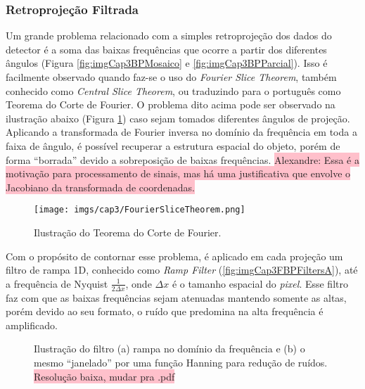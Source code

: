 \subsubsection{Retroprojeção Filtrada}\label{RetroprojeçãoFiltrada}

Um grande problema relacionado com a simples retroprojeção dos dados do detector é a soma das baixas frequências que ocorre a partir dos diferentes ângulos (Figura \ref{fig:imgCap3BPMosaico} e \ref{fig:imgCap3BPParcial}). Isso é facilmente observado quando faz-se o uso do \textit{Fourier Slice Theorem}, também conhecido como \textit{Central Slice Theorem}, ou traduzindo para o português como Teorema do Corte de Fourier. O problema dito acima pode ser observado na ilustração abaixo (Figura \ref{fig:imgCap3FourierSliceTheorem}) caso sejam tomados diferentes ângulos de projeção. Aplicando a transformada de Fourier inversa no domínio da frequência em toda a faixa de ângulo, é possível recuperar a estrutura espacial do objeto, porém de forma ``borrada'' devido a sobreposição de baixas frequências. \colorbox{pink}{Alexandre: Essa é a motivação para processamento de sinais, mas há uma justificativa que envolve o Jacobiano da transformada de coordenadas.}    

\begin{figure}[H]
	\caption{Ilustração do Teorema do Corte de Fourier.}
	\begin{center}
		\texttt{[image: imgs/cap3/FourierSliceTheorem.png]}
	\end{center}
	\label{fig:imgCap3FourierSliceTheorem}
\end{figure}

Com o propósito de contornar esse problema, é aplicado em cada projeção um filtro de rampa \acs{1D}, conhecido como \textit{Ramp Filter} (\ref{fig:imgCap3FBPFiltersA}), até a frequência de Nyquist $\frac{1}{2 \varDelta x}$, onde $\varDelta x$ é o tamanho espacial do \textit{pixel}. Esse filtro faz com que as baixas frequências sejam atenuadas mantendo somente as altas, porém devido ao seu formato, o ruído que predomina na alta frequência é amplificado. 

\begin{figure}[H]
	\centering
	
	\caption{Ilustração do filtro (a) rampa no domínio da frequência e (b) o mesmo ``janelado'' por uma função Hanning para redução de ruídos. \colorbox{pink}{Resolução baixa, mudar pra .pdf}}
	
	\hfil
	\hfil
	
	\label{fig:imgCap3FBPFilters}
\end{figure}

